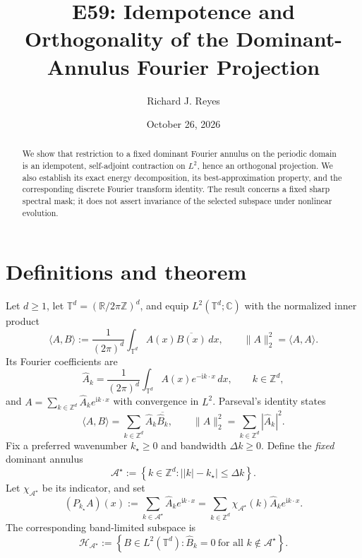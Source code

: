 \documentclass[11pt]{article}
\title{E59: Idempotence and Orthogonality of the Dominant-Annulus Fourier Projection}
\author{Richard J. Reyes}
\date{October 26, 2026}
\newcommand{\TT}{\mathbb{T}}
\newcommand{\ZZ}{\mathbb{Z}}
\newcommand{\calA}{\mathcal{A}^{\star}}
\newcommand{\calH}{\mathcal{H}_{\calA}}
\newcommand{\PA}{P_{k_{\star}}}
\newcommand{\ii}{\mathrm{i}}
\begin{document}
\maketitle

\begin{abstract}
We show that restriction to a fixed dominant Fourier annulus on the periodic domain
is an idempotent, self-adjoint contraction on $L^{2}$, hence an orthogonal projection.
We also establish its exact energy decomposition, its best-approximation property,
and the corresponding discrete Fourier transform identity.  The result concerns a
fixed sharp spectral mask; it does not assert invariance of the selected subspace
under nonlinear evolution.
\end{abstract}

\section{Definitions and theorem}
Let $d\geq 1$, let $\TT^{d}=(\mathbb{R}/2\pi\ZZ)^{d}$, and equip
$L^{2}(\TT^{d};\mathbb{C})$ with the normalized inner product
\begin{equation}
\langle A,B\rangle := \frac{1}{(2\pi)^{d}}
  \int_{\TT^{d}} A(x)\overline{B(x)}\,dx,
\qquad \|A\|_{2}^{2}=\langle A,A\rangle.
\end{equation}
Its Fourier coefficients are
\begin{equation}
\widehat A_{k}=\frac{1}{(2\pi)^{d}}
  \int_{\TT^{d}} A(x)e^{-\ii k\cdot x}\,dx,
\qquad k\in\ZZ^{d},
\end{equation}
and $A=\sum_{k\in\ZZ^{d}}\widehat A_{k}e^{\ii k\cdot x}$
with convergence in $L^{2}$.  Parseval's identity states
\begin{equation}\label{eq:parseval}
\langle A,B\rangle = \sum_{k\in\ZZ^{d}}
    \widehat A_{k}\overline{\widehat B_{k}},
\qquad \|A\|_{2}^{2}=\sum_{k\in\ZZ^{d}}|\widehat A_{k}|^{2}.
\end{equation}
Fix a preferred wavenumber $k_{\star}\geq0$ and bandwidth
$\Delta k\geq0$.  Define the \emph{fixed} dominant annulus
\begin{equation}\label{eq:annulus}
\calA:=\left\{k\in\ZZ^{d}:\bigl||k|-k_{\star}\bigr|\leq\Delta k\right\}.
\end{equation}
Let $\chi_{\calA}$ be its indicator, and set
\begin{equation}\label{eq:projection}
(\PA A)(x)
 :=\sum_{k\in\calA}\widehat A_{k}e^{\ii k\cdot x}
 =\sum_{k\in\ZZ^{d}}\chi_{\calA}(k)\widehat A_{k}e^{\ii k\cdot x}.
\end{equation}
The corresponding band-limited subspace is
\begin{equation}
\calH:=\left\{B\in L^{2}(\TT^{d}):
\widehat B_{k}=0\ \text{for all }k\notin\calA\right\}.
\end{equation}
\end{document}
